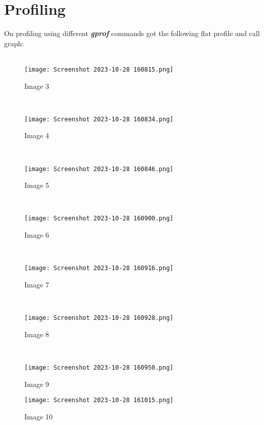 \documentclass{article}
\begin{document}
\section{Profiling}
On profiling using different \textbf{\textit{gprof }}commands got the following flat profile and call graph:\\
\\
\begin{figure}[h]
  \centering
  \texttt{[image: Screenshot 2023-10-28 160815.png]}
  \caption{Image 3}
\end{figure}
\\
\begin{figure}[h]
  \centering
  \texttt{[image: Screenshot 2023-10-28 160834.png]}
  \caption{Image 4}
\end{figure}
\\
\begin{figure}[h]
  \centering
  \texttt{[image: Screenshot 2023-10-28 160846.png]}
  \caption{Image 5}
\end{figure}
\\
\begin{figure}[h]
  \centering
  \texttt{[image: Screenshot 2023-10-28 160900.png]}
  \caption{Image 6}
\end{figure}
\\
\begin{figure}[h]
  \centering
  \texttt{[image: Screenshot 2023-10-28 160916.png]}
  \caption{Image 7}
\end{figure}
\\
\begin{figure}[h]
  \centering
  \texttt{[image: Screenshot 2023-10-28 160928.png]}
  \caption{Image 8}
\end{figure}
\\
\begin{figure}[h]
  \centering
  \texttt{[image: Screenshot 2023-10-28 160950.png]}
  \caption{Image 9}
\end{figure}
\begin{figure}[h]
  \centering
  \texttt{[image: Screenshot 2023-10-28 161015.png]}
  \caption{Image 10}
\end{figure}
\\
\end{document}
